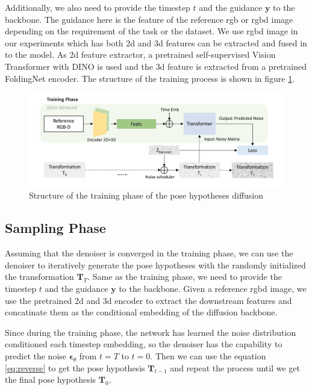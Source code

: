 \documentclass[12pt,DIV14,BCOR12mm,a4paper,footinclude=false,headinclude,parskip=half-,twoside,openright,cleardoublepage=empty,toc=index,bibliography=totoc,listof=totoc]{scrreprt}
\numberwithin{equation}{chapter}
\begin{document}
Additionally, we also need to provide the timestep $t$ and the guidance $\mathbf{y}$ to the backbone. The guidance here is the feature of the reference \gls{rgb} or \gls{rgbd} image depending on the requirement of the task or the dataset. We use \gls{rgbd} image in our experiments which has both \gls{2d} and \gls{3d} features can be extracted and fused in to the model. As \gls{2d} feature extractor, a pretrained self-supervised Vision Transformer
 with DINO\cite{caron2021emerging} is used and the \gls{3d} feature is extracted from a pretrained FoldingNet encoder\cite{yang2018foldingnet}. The structure of the training process is shown in figure \ref{img:train}.

\begin{figure}[h]
	\centering
	\includegraphics[scale=.235]{img/train.png}
	\caption{Structure of the training phase of the pose hypotheses diffusion}
	\label{img:train}
\end{figure}

\subsection{Sampling Phase}
Assuming that the denoiser is converged in the training phase, we can use the denoiser to iteratively generate the pose hypotheses with the randomly initialized the transformation $\mathbf{T}_{T}$. Same as the training phase, we need to provide the timestep $t$ and the guidance $\mathbf{y}$ to the backbone. Given a reference \gls{rgbd} image, we use the pretrained \gls{2d} and \gls{3d} encoder to extract the downstream features and concatinate them as the conditional embedding of the diffusion backbone. 

Since during the training phase, the network has learned the noise distribution conditioned each timestep embedding, so the denoiser has the capability to predict the noise $\boldsymbol{\epsilon}_{\theta}$ from $t=T$ to $t=0$. Then we can use the equation \ref{eq:reverse} to get the pose hypothesis $\mathbf{T}_{t-1}$ and repeat the process until we get the final pose hypothesis $\mathbf{T}_{0}$. 
\end{document}
